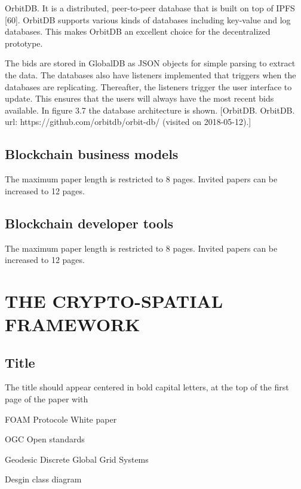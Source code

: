 \documentclass{isprs} %
\begin{document}
OrbitDB. It is a distributed, peer-to-peer database that is built on top of IPFS [60]. OrbitDB supports various kinds of databases including key-value and log databases. This makes OrbitDB an excellent choice for the decentralized prototype. 

The bids are stored in GlobalDB as JSON objects for simple parsing to extract
the data. The databases also have listeners implemented that triggers when the
databases are replicating. Thereafter, the listeners trigger the user interface to update. This ensures that the users will always have the most recent bids available.
In figure 3.7 the database architecture is shown.
[OrbitDB. OrbitDB. url: https://github.com/orbitdb/orbit-db/ (visited
on 2018-05-12).]


\subsection{Blockchain business models}\label{sec:Blockchain business models}

The maximum paper length is restricted to 8 pages. Invited papers can be increased to 12 pages. 

\subsection{Blockchain developer tools}\label{sec:Blockchain developer tools}

The maximum paper length is restricted to 8 pages. Invited papers can be increased to 12 pages. 



\section{THE CRYPTO-SPATIAL FRAMEWORK}\label{sec:THE CRYPTO-SPATIAL FRAMEWORK}

\subsection{Title}\label{sec:Title}

The title should appear centered in bold capital letters, at the top of the 
first page of the paper with 

FOAM Protocole White paper

OGC Open standards 

Geodesic Discrete Global Grid Systems


Desgin class diagram 
\end{document}
